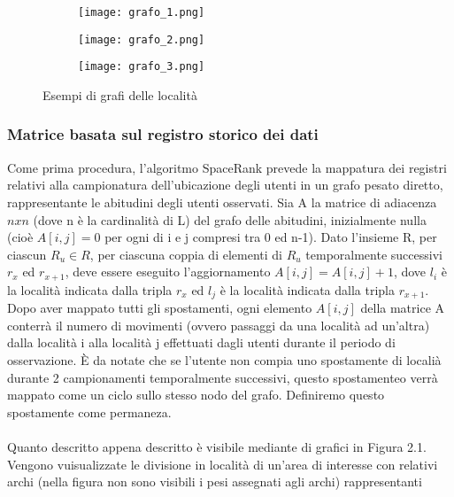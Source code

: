 \begin{figure}
  \centering
  \begin{subfigure}[a]{0.3\textwidth}
      \texttt{[image: grafo\_1.png]}
      \label{fig:a}
  \end{subfigure}
  \begin{subfigure}[b]{0.3\textwidth}
      \texttt{[image: grafo\_2.png]}
      \label{fig:a}
  \end{subfigure}
  \begin{subfigure}[c]{0.3\textwidth}
      \texttt{[image: grafo\_3.png]}
      \label{fig:a}
  \end{subfigure}
  \caption[Fig 1.1]{Esempi di grafi delle localit\`a}
  \label{fig2.1}
\end{figure}

\subsubsection{Matrice basata sul registro storico dei dati}
Come prima procedura, l'algoritmo SpaceRank prevede la mappatura
dei registri relativi alla campionatura dell'ubicazione degli utenti in un grafo
pesato diretto, rappresentante le abitudini degli utenti osservati.
Sia A la matrice di adiacenza $n x n$ (dove n \`e la cardinalit\`a di L) del
grafo delle abitudini, inizialmente nulla (cio\`e $A[i, j] = 0$ per ogni di i e j
compresi tra 0 ed n-1). Dato l'insieme R, per ciascun $R_{u} \in R$, per ciascuna
coppia di elementi di $R_{u}$ temporalmente successivi $r_{x}$ ed $r_{x+1}$, deve essere eseguito
l'aggiornamento $A[i, j] = A[i, j] + 1$, dove $l_{i}$ \`e la localit\`a indicata dalla
tripla $r_{x}$ ed $l_{j}$ \`e la localit\`a indicata dalla tripla $r_{x+1}$.
Dopo aver mappato tutti gli spostamenti, ogni elemento $A[i, j]$ della matrice A
conterr\`a il numero di movimenti (ovvero passaggi da una localit\`a ad un'altra)
dalla localit\`a i alla localit\`a j effettuati dagli utenti durante il periodo di osservazione.
\`E da notate che se l'utente non compia uno spostamente di locali\`a durante 2 campionamenti
temporalmente successivi, questo spostamenteo verr\`a mappato come un ciclo sullo
stesso nodo del grafo. Definiremo questo spostamente come permaneza.\\
\\
Quanto descritto appena descritto \`e visibile mediante di grafici in Figura 2.1.
Vengono vuisualizzate le divisione in localit\`a di un'area di interesse con
relativi archi (nella figura non sono visibili i pesi assegnati agli archi) rappresentanti

